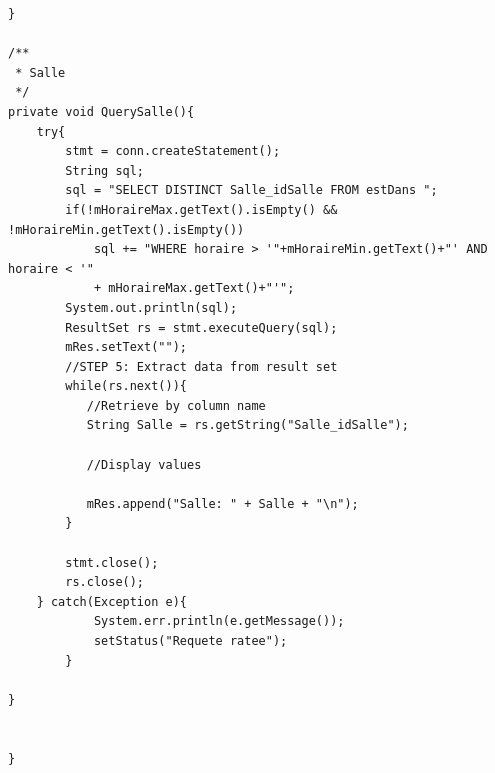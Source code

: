 \documentclass{article}
\begin{document}
\begin{verbatim}
}

/**
 * Salle
 */
private void QuerySalle(){
	try{
		stmt = conn.createStatement();
	    String sql;
	    sql = "SELECT DISTINCT Salle_idSalle FROM estDans ";
	    if(!mHoraireMax.getText().isEmpty() && !mHoraireMin.getText().isEmpty())
	    	sql += "WHERE horaire > '"+mHoraireMin.getText()+"' AND horaire < '"
	    	+ mHoraireMax.getText()+"'";
	    System.out.println(sql);
	    ResultSet rs = stmt.executeQuery(sql);
	    mRes.setText("");
	    //STEP 5: Extract data from result set
	    while(rs.next()){
	       //Retrieve by column name
	       String Salle = rs.getString("Salle_idSalle");
	
	       //Display values
	       
	       mRes.append("Salle: " + Salle + "\n");
	    }
	    
	    stmt.close();
	    rs.close();
	} catch(Exception e){
			System.err.println(e.getMessage());
			setStatus("Requete ratee");
		}
	
}


}

\end{verbatim}
\end{document}
